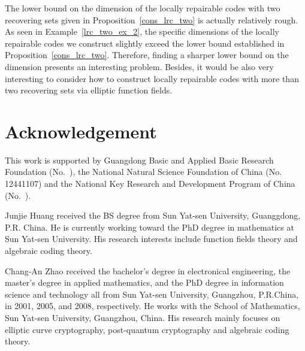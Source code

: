 \documentclass[journal,12pt,onecolumn]{IEEEtran}
\begin{document}
The lower bound on the dimension of the locally repairable codes with two recovering sets given in Proposition~\ref{cons_lrc_two} is actually relatively rough. As seen in Example~\ref{lrc_two_ex_2}, the specific dimensions of the locally repairable codes we construct slightly exceed the lower bound established in Proposition~\ref{cons_lrc_two}. Therefore, finding a sharper lower bound on the dimension presents an interesting problem. Besides, it would be also very interesting to consider how to construct locally repairable codes with more than two recovering sets via elliptic function fields. 






\section*{Acknowledgement}

This work is supported by Guangdong Basic and Applied Basic Research Foundation (No.~), the National Natural Science Foundation of China (No. 12441107) and  the National Key Research and Development Program of
China (No.~).




\begin{IEEEbiographynophoto}{Junjie Huang}
received the BS degree from Sun Yat-sen University, Guanggdong, P.R. China. He is currently working toward the PhD degree in mathematics at Sun Yat-sen University. His research interests include function fields theory and algebraic coding theory.
\end{IEEEbiographynophoto}

\begin{IEEEbiographynophoto}{Chang-An Zhao}
received the bachelor’s degree in electronical engineering, the master’s degree in applied mathematics, and the PhD degree in information science and technology all from Sun Yat-sen University, Guangzhou, P.R.China, in 2001, 2005, and 2008, respectively. He works with the School of Mathematics, Sun Yat-sen University, Guangzhou, China. His research mainly focuses on elliptic curve cryptography, post-quantum cryptography and algebraic coding theory.
\end{IEEEbiographynophoto}
\end{document}
